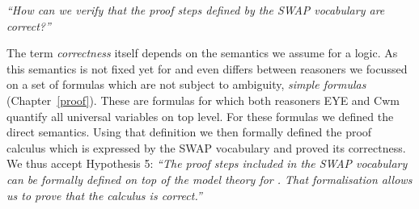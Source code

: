 \emph{``How can we verify that the proof steps defined by the SWAP vocabulary are correct?''}

The term \emph{correctness} itself depends on  the semantics we assume for a logic. As this semantics is not fixed yet for \nthree and even differs between reasoners
we focussed on a set of \nthree formulas which are not subject to ambiguity, \emph{simple formulas} (Chapter~\ref{proof}). %
These are formulas
for which both reasoners EYE and Cwm quantify all universal variables on top level.
For these formulas we defined the direct semantics. %
Using that definition we then formally defined the proof calculus which is expressed by the SWAP vocabulary and proved its correctness.
We thus accept 
Hypothesis 5:
\emph{``The proof steps included in the SWAP vocabulary can be formally defined on top of the model theory for \nthree. 
That formalisation allows us to prove that the calculus is correct.''}



